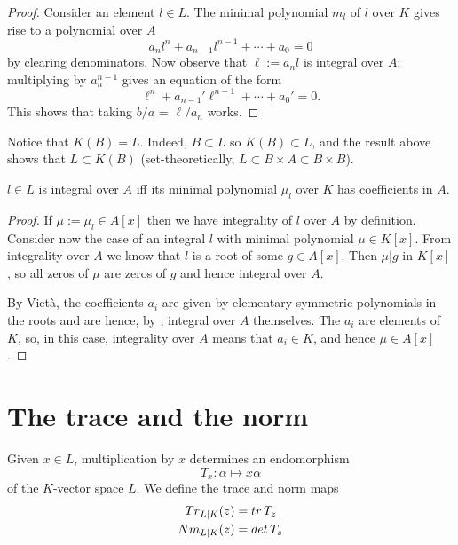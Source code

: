 \begin{proof}
  Consider an element $l \in L$. The minimal polynomial $m_l$ of $l$ over $K$
  gives rise to a polynomial over $A$
  \[ a_nl^n + a_{n-1}l^{n-1} + \cdots + a_0 = 0 \] by clearing denominators. Now
  observe that $\ell := a_nl$ is integral over $A$: multiplying by $a_n^{n-1}$
  gives an equation of the form
  \[ \ell^n + a_{n-1}'\ell^{n-1} + \cdots + a_0' = 0. \] This shows that taking
  $b/a$ = $\ell/a_n$ works.
\end{proof}

\begin{remark}
  Notice that $K(B) = L$. Indeed, $B \subset L$ so $K(B) \subset L$, and the
  result above shows that $L \subset K(B)$ (set-theoretically, $L \subset B
  \times A \subset B \times B$).
\end{remark}

\begin{theorem}
  $l \in L$ is integral over $A$ iff its minimal polynomial $\mu_l$ over $K$ has
  coefficients in $A$.
\end{theorem}

\begin{proof}
  If $\mu := \mu_l \in A[x]$ then we have integrality of $l$ over $A$ by
  definition. Consider now the case of an integral $l$ with minimal polynomial
  $\mu \in K[x]$. From integrality over $A$ we know that $l$ is a root of some
  $g \in A[x]$. Then $\mu | g$ in $K[x]$, so all zeros of $\mu$ are zeros of $g$
  and hence integral over $A$.

  \npar By Viet\`a, the coefficients $a_i$ are given by elementary symmetric
  polynomials in the roots and are hence, by
  , integral over $A$ themselves. The $a_i$
  are elements of $K$, so, in this case, integrality over $A$ means that $a_i
  \in K$, and hence $\mu \in A[x]$.
\end{proof}

\section{The trace and the norm}

Given $x \in L$, multiplication by $x$ determines an endomorphism
\[ T_x : \alpha \mapsto x\alpha \] of the $K$-vector space $L$. We define the
trace and norm maps
\begin{align*}
  {\mathnormal{Tr}}_{L|K}(z) &= \operatorname{{\mathnormal{tr}}} T_z\\
  {\mathnormal{Nm}}_{L|K}(z) &= \operatorname{{\mathnormal{det}}} T_z
\end{align*}

